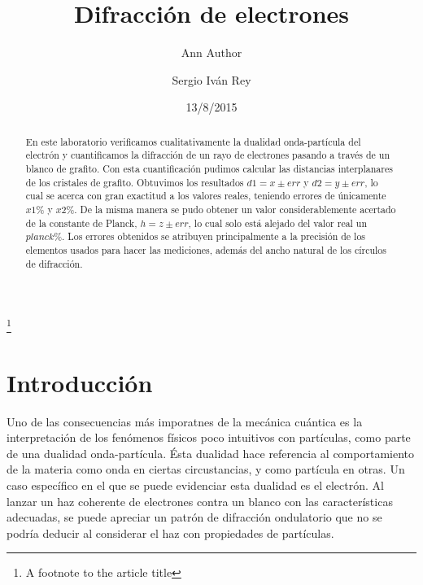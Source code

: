 \documentclass[%
 reprint,
 amsmath,amssymb,
 aps,
]{revtex4-1}
\begin{document}

\title{Difracción de electrones}%
\thanks{A footnote to the article title}%

\author{Ann Author}
\author{Sergio Iv\'an Rey}%
%

\date{13/8/2015}%

\begin{abstract}
En este laboratorio verificamos cualitativamente la dualidad onda-partícula del electrón y cuantificamos la difracción de un rayo de electrones pasando a través de un blanco de grafito. Con esta cuantificación pudimos calcular las distancias interplanares de los cristales de grafito. Obtuvimos los resultados $d1 = x \pm err$ y $d2 = y \pm err$, lo cual se acerca con gran exactitud a los valores reales, teniendo errores de únicamente $ x1\%$ y $ x2\%$. De la misma manera se pudo obtener un valor considerablemente acertado de la constante de Planck, $ h = z \pm err $, lo cual solo está alejado del valor real un $ planck\% $. Los errores obtenidos se atribuyen principalmente a la precisión de los elementos usados para hacer las mediciones, además del ancho natural de los círculos de difracción.
\end{abstract}


\maketitle


\section{\label{sec:level1}Introducci\'on}
Uno de las consecuencias más imporatnes de la mecánica cuántica es la interpretación de los fenómenos físicos poco intuitivos con partículas, como parte de una dualidad onda-partícula. Ésta dualidad hace referencia al comportamiento de la materia como onda en ciertas circustancias, y como partícula en otras. Un caso específico en el que se puede evidenciar esta dualidad es el electrón. Al lanzar un haz coherente de electrones contra un blanco con las características adecuadas, se puede apreciar un patrón de difracción ondulatorio que no se podría deducir al considerar el haz con propiedades de partículas.\\
\end{document}
